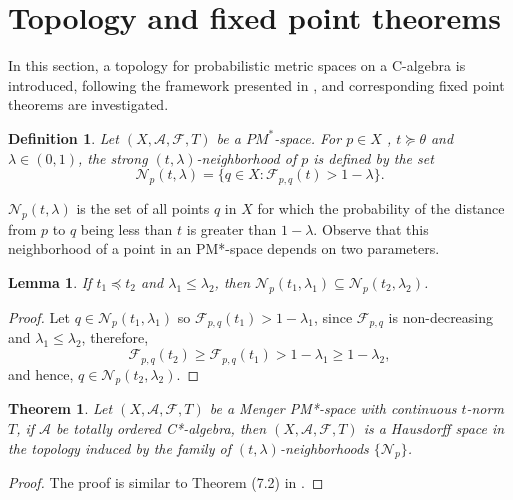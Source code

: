 \documentclass{amsart}%
\newtheorem{theorem}{Theorem}
\theoremstyle{plain}
\newtheorem{definition}{Definition}
\newtheorem{lemma}{Lemma}
\numberwithin{equation}{section}
\begin{document}
\section{Topology and fixed point theorems}
In this section, a topology for probabilistic metric spaces on a C-algebra is introduced, following the framework presented in \cite{Sh.Skalar}, and corresponding fixed point theorems are investigated.
\begin{definition}
	Let $(X,\mathcal{A},\mathcal{F},T)$ be a $PM^*$-space. For $p\in X$ , $t\succeq \theta$ and $\lambda\in (0,1)$, the {\em strong $(t,\lambda)$-neighborhood} of $p$ is defined by the set 
	$$\mathcal{N}_p(t,\lambda)=\{q \in X : \mathcal{F}_{p,q}(t)>1-\lambda\}.$$
\end{definition}
$\mathcal{N}_p(t,\lambda)$ is the set of all points $q$ in $X$ for which the probability of the distance from $p$ to $q$ being less than $t$ is greater than $1-\lambda$. Observe that this neighborhood of a point in an PM*-space depends on two parameters.

\begin{lemma}
	If $t_1\preceq t_2$ and $\lambda_1 \leq \lambda_2$, then $\mathcal{N}_p(t_1,\lambda_1)\subseteq \mathcal{N}_p(t_2,\lambda_2)$.
\end{lemma}
\begin{proof}
	Let $q\in \mathcal{N}_p(t_1,\lambda_1)$ so $\mathcal{F}_{p,q}(t_1)>1-\lambda_1$, since $\mathcal{F}_{p,q}$ is non-decreasing and $\lambda_1 \leq \lambda_2$, therefore,
	$$\mathcal{F}_{p,q}(t_2)\geq \mathcal{F}_{p,q}(t_1)>1-\lambda_1\geq 1-\lambda_2,$$
	and hence,  $q\in \mathcal{N}_p(t_2,\lambda_2)$.
\end{proof}

\begin{theorem}
	Let $(X,\mathcal{A},\mathcal{F},T)$ be a Menger PM*-space with continuous $t$-norm $T$, if $\mathcal{A}$ be totally ordered C*-algebra, then $(X,\mathcal{A},\mathcal{F},T)$ is a Hausdorff space in the topology induced by the family of $(t,\lambda)$-neighborhoods $\{\mathcal{N}_p\}$.
\end{theorem}
\begin{proof}
	The proof is similar to Theorem (7.2) in \cite{Sh.Skalar}. 
\end{proof}
\end{document}
